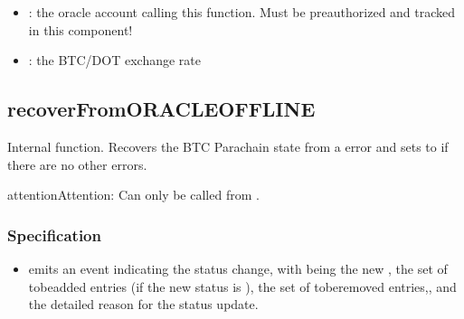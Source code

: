 \documentclass[a4paper,10pt,english]{sphinxmanual}
\begin{document}
\begin{itemize}
\item {} 
: the oracle account calling this function. Must be pre\sphinxhyphen{}authorized and tracked in this component!

\item {} 
: the  BTC/DOT exchange rate

\end{itemize}


{\hyperref[\detokenize{spec/oracle:setexchangerate}]{}}


\subsection{recoverFromORACLEOFFLINE}
\label{\detokenize{spec/oracle:recoverfromoracleoffline}}\label{\detokenize{spec/oracle:id12}}
Internal function. Recovers the BTC Parachain state from a  error and sets  to  if there are no other errors.

\begin{sphinxadmonition}{attention}{Attention:}
Can only be called from {\hyperref[\detokenize{spec/oracle:oracle}]{}}.
\end{sphinxadmonition}


\subsubsection{Specification}
\label{\detokenize{spec/oracle:id13}}


\begin{itemize}
\item {} 
 \sphinxhyphen{} emits an event indicating the status change, with  being the new ,  the set of to\sphinxhyphen{}be\sphinxhyphen{}added  entries (if the new status is ),  the set of to\sphinxhyphen{}be\sphinxhyphen{}removed  entries,, and  the detailed reason for the status update.

\end{itemize}
\end{document}
